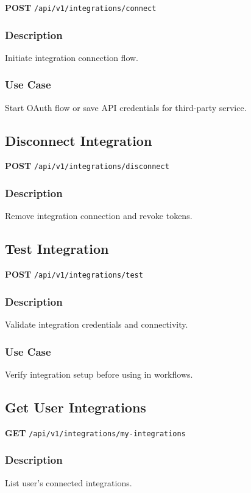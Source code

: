 \documentclass[11pt,a4paper]{report}
\begin{document}
\textbf{POST} \texttt{/api/v1/integrations/connect}

\subsubsection{Description}
Initiate integration connection flow.

\subsubsection{Use Case}
Start OAuth flow or save API credentials for third-party service.

\subsection{Disconnect Integration}

\textbf{POST} \texttt{/api/v1/integrations/disconnect}

\subsubsection{Description}
Remove integration connection and revoke tokens.

\subsection{Test Integration}

\textbf{POST} \texttt{/api/v1/integrations/test}

\subsubsection{Description}
Validate integration credentials and connectivity.

\subsubsection{Use Case}
Verify integration setup before using in workflows.

\subsection{Get User Integrations}

\textbf{GET} \texttt{/api/v1/integrations/my-integrations}

\subsubsection{Description}
List user's connected integrations.
\end{document}
